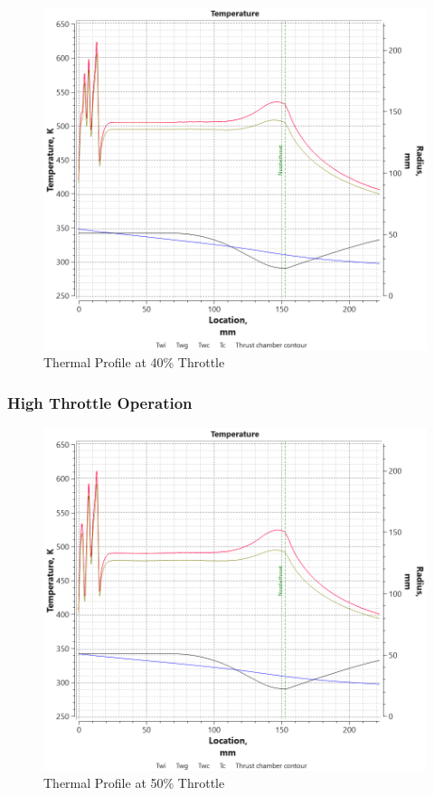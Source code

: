 \begin{figure}[H]
    \centering
    \includegraphics[width=\linewidth]{Images/40_throttle_80_20_2film3.8of_4.8xfilm_aluminum_1.5mmwall_600Lstar_rao_55channels.png}
    \caption{Thermal Profile at 40\% Throttle}
    \label{fig:40_throttle}
\end{figure}

\subsubsection{High Throttle Operation}
\begin{figure}[H]
    \centering
    \includegraphics[width=\linewidth]{Images/50_throttle_80_20_2film3.8of_4.8xfilm_aluminum_1.5mmwall_600Lstar_rao_55channels.png}
    \caption{Thermal Profile at 50\% Throttle}
    \label{fig:50_throttle}
\end{figure}
    
